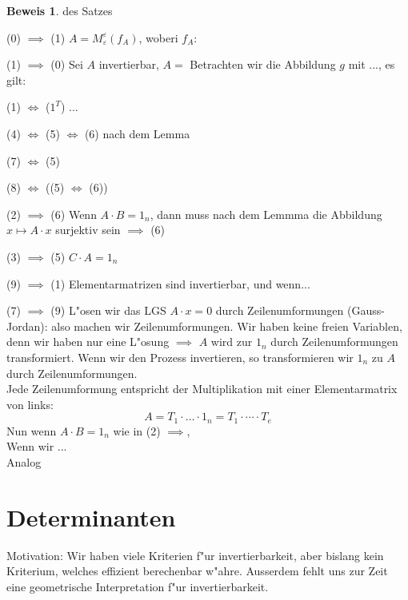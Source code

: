 \documentclass[oneside,fontsize=11pt,paper=a4,BCOR=0mm,DIV=12,automark,headsepline]{scrbook}
\theoremstyle{remark}
\theoremstyle{definition}
\theoremstyle{definition}
\newtheorem*{prof}{Beweis}
\theoremstyle{remark}
\begin{document}
\begin{prof}{des Satzes}\leavevmode
  \begin{trivlist}
  \item[(0) $\implies$ (1)]  $A=M^{\varepsilon}_{\varepsilon}(f_A)$, woberi $f_A:$
  \item[(1) $\implies$ (0)] Sei $A$ invertierbar, $A=$ Betrachten wir die
    Abbildung $g$ mit ..., es gilt: 
  \item[(1) $\iff$ ($1^T$)] ...
  \item[(4) $ \iff $ (5) $ \iff $ (6)] nach dem Lemma
  \item[(7) $ \iff $ (5)]
  \item[(8) $ \iff $ ((5) $ \iff $ (6))]
  \item[(2) $ \implies $ (6)] Wenn $A\cdot B=1_n$, dann muss nach dem Lemmma die
    Abbildung $x\mapsto A\cdot x$ surjektiv sein $\implies$ (6)
  \item[(3) $ \implies $ (5)] $C\cdot A = 1_n$
  \item[(9) $ \implies $ (1)] Elementarmatrizen sind invertierbar, und wenn...
  \item[(7) $ \implies $ (9)] L"osen wir das LGS $A\cdot x = 0$ durch
    Zeilenumformungen (Gauss-Jordan): also machen wir Zeilenumformungen. Wir
    haben keine freien Variablen, denn wir haben nur eine L"osung $\implies$
    $A$ wird zur $1_n$ durch Zeilenumformungen transformiert. Wenn wir den
    Prozess invertieren, so transformieren wir $1_n$ zu $A$ durch
    Zeilenumformungen. \\
    Jede Zeilenumformung entspricht der Multiplikation mit einer
    Elementarmatrix von links: \[A=T_1 \cdot \dots \cdot 1_n = T_1 \cdot \cdots
      \cdot T_e\]
    Nun wenn $A\cdot B = 1_n$ wie in (2) $\implies$, \\
    Wenn wir ... \\
    Analog
  \end{trivlist}
\end{prof}

\chapter{Determinanten}
\label{sec:det}

Motivation: Wir haben viele Kriterien f"ur invertierbarkeit, aber bislang kein
Kriterium, welches effizient berechenbar w"ahre. Ausserdem fehlt uns zur Zeit
eine geometrische Interpretation f"ur invertierbarkeit.
\end{document}
